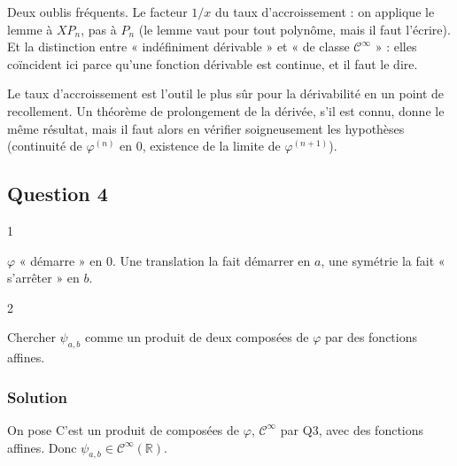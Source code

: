 \documentclass[11pt,a4paper]{article}
\newcommand{\equationajustee}[1]{%
  \sbox{\boiteequation}{$\displaystyle #1$}%
  \ifdim\wd\boiteequation>\linewidth
    \[\resizebox{\linewidth}{!}{\usebox{\boiteequation}}\]%
  \else
    \[#1\]%
  \fi}
\begin{document}
\begin{piege}

Deux oublis fréquents. Le facteur \(1/x\) du taux d'accroissement : on applique le lemme à \(XP_n\), pas à \(P_n\) (le lemme vaut pour tout polynôme, mais il faut l'écrire). Et la distinction entre « indéfiniment dérivable » et « de classe \(\mathcal C^\infty\) » : elles coïncident ici parce qu'une fonction dérivable est continue, et il faut le dire.

\end{piege}

\begin{methode}

Le taux d'accroissement est l'outil le plus sûr pour la dérivabilité en un point de recollement. Un théorème de prolongement de la dérivée, s'il est connu, donne le même résultat, mais il faut alors en vérifier soigneusement les hypothèses (continuité de \(\varphi^{(n)}\) en \(0\), existence de la limite de \(\varphi^{(n+1)}\)).

\end{methode}

\hypertarget{question-4}{%
\subsection{Question 4}\label{question-4}}

\begin{indication}{1}

\(\varphi\) « démarre » en \(0\). Une translation la fait démarrer en \(a\), une symétrie la fait « s'arrêter » en \(b\).

\end{indication}

\begin{indication}{2}

Chercher \(\psi_{a,b}\) comme un produit de deux composées de \(\varphi\) par des fonctions affines.

\end{indication}

\hypertarget{solution-3}{%
\subsubsection{Solution}\label{solution-3}}

On pose
\equationajustee{\boxed{\psi_{a,b}(x)=\varphi(x-a)\,\varphi(b-x)}}
C'est un produit de composées de \(\varphi\), \(\mathcal C^\infty\) par Q3, avec des fonctions affines. Donc \(\psi_{a,b}\in\mathcal C^\infty(\mathbb R)\).
\end{document}
